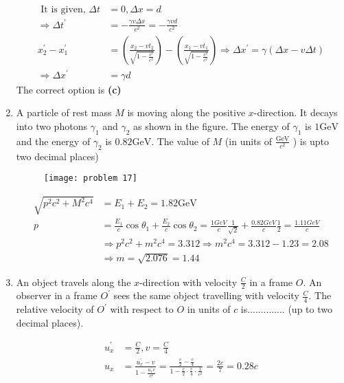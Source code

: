 \begin{enumerate}
\begin{answer}
\begin{align*}
	\text { It is given, } \Delta t&=0, \Delta x=d\\
	\Rightarrow \Delta t^{\prime}&=-\frac{\gamma v \Delta x}{c^{2}}=-\frac{\gamma v d}{c^{2}}\\
	x_{2}^{\prime}-x_{1}^{\prime}&=\left(\frac{x_{2}-v t_{2}}{\sqrt{1-\frac{v^{2}}{c^{2}}}}\right)-\left(\frac{x_{1}-v t_{1}}{\sqrt{1-\frac{v^{2}}{c^{2}}}}\right) \Rightarrow \Delta x^{\prime}=\gamma(\Delta x-v \Delta t)\\
	\Rightarrow \Delta x^{\prime}&=\gamma d
	\end{align*}
	The correct option is \textbf{(c)}
\end{answer}
	\item A particle of rest mass $M$ is moving along the positive $x$-direction. It decays into two photons $\gamma_{1}$ and $\gamma_{2}$ as shown in the figure. The energy of $\gamma_{1}$ is $1 \mathrm{GeV}$ and the energy of $\gamma_{2}$ is $0.82 \mathrm{GeV}$. The value of $M$ (in units of $\frac{\mathrm{GeV}}{c^{2}}$ ) is upto two decimal places)
	{}
	\begin{figure}[H]
		\centering
		\texttt{[image: problem 17]}
	\end{figure}
\begin{answer}
\begin{align*}
\sqrt{p^{2} c^{2}+M^{2} c^{4}}&=E_{1}+E_{2}=1.82 \mathrm{GeV}\\
p&=\frac{E_{1}}{c} \cos \theta_{1}+\frac{E_{2}}{c} \cos \theta_{2}=\frac{1 G e V}{c} \frac{1}{\sqrt{2}}+\frac{0.82 G e V}{c} \frac{1}{2}=\frac{1.11 G e V}{c}\\
&\Rightarrow p^{2} c^{2}+m^{2} c^{4}=3.312 \Rightarrow m^{2} c^{4}=3.312-1.23=2.08\\
&\Rightarrow m=\sqrt{2.076}=1.44
\end{align*}
\end{answer}
	\item An object travels along the $x$-direction with velocity $\frac{C}{2}$ in a frame $O$. An observer in a frame $O^{\prime}$ sees the same object travelling with velocity $\frac{C}{4}$. The relative velocity of $O^{\prime}$ with respect to $O$ in units of $c$ is.............. (up to two decimal places).
	{}
\begin{answer}
	\begin{align*}
	u_{x}^{\prime}&=\frac{C}{2}, v=\frac{C}{4}\\
	u_{x}&=\frac{u_{x}^{\prime}-v}{1-\frac{u_{x}^{\prime} v}{c^{2}}}=\frac{\frac{c}{2}-\frac{c}{4}}{1-\frac{c}{2} \cdot \frac{c}{4} \cdot \frac{1}{c^{2}}}=\frac{2 c}{7}=0.28 c

\end{align*}
\end{answer}
\end{enumerate}
